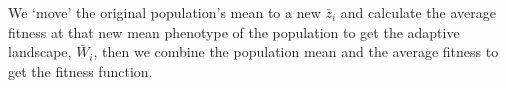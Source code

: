 \documentclass{standalone}
\begin{document}
\setmainfont{texgyreadventor}\fontsize{12}{15}\selectfont{}\begin{minipage}{3.5in}We `move' the original population's mean to a new $\bar z_i$ and calculate the average fitness at that new mean phenotype of the population to get the adaptive landscape, $\bar W_i$, then we combine the population mean and the average fitness to get the \textcolor{Rred}{fitness function}.\end{minipage}
\end{document}
